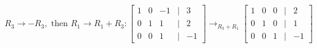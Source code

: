\documentclass[preview]{standalone}
\begin{document}
\begin{align*}
R_3 \rightarrow -R_3, \text{ then } R_1 \rightarrow R_1 + R_3: \begin{bmatrix} 1 & 0 & -1 & | & 3 \\ 0 & 1 & 1 & | & 2 \\ 0 & 0 & 1 & | & -1 \end{bmatrix} \rightarrow_{R_3 + R_1} \begin{bmatrix} 1 & 0 & 0 & | & 2 \\ 0 & 1 & 0 & | & 1 \\ 0 & 0 & 1 & | & -1 \end{bmatrix}
\end{align*}
\end{document}
